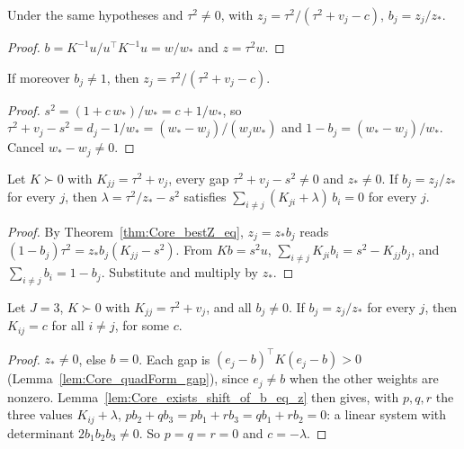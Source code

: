 \begin{theorem}\label{thm:Core_b_eq_of_equalCov}
  \leanok
  Under the same hypotheses and $\tau^2 \ne 0$, with
  $z_j = \tau^2/(\tau^2 + v_j - c)$, $b_j = z_j/z_*$.
\end{theorem}
\begin{proof}
  \leanok
  $b = K^{-1}u/u^\top K^{-1}u = w/w_*$ and $z = \tau^2 w$.
\end{proof}

\begin{theorem}\label{thm:Core_bestZ_of_equalCov}
  \leanok
  If moreover $b_j \ne 1$, then $z_j = \tau^2/(\tau^2 + v_j - c)$.
\end{theorem}
\begin{proof}
  \leanok
  $s^2 = (1 + c\,w_*)/w_* = c + 1/w_*$, so
  $\tau^2 + v_j - s^2 = d_j - 1/w_* = (w_* - w_j)/(w_j w_*)$ and
  $1 - b_j = (w_* - w_j)/w_*$. Cancel $w_* - w_j \ne 0$.
\end{proof}

\begin{lemma}\label{lem:Core_exists_shift_of_b_eq_z}
  \leanok
  Let $K \succ 0$ with $K_{jj} = \tau^2 + v_j$, every gap $\tau^2 + v_j - s^2 \ne 0$ and
  $z_* \ne 0$. If $b_j = z_j/z_*$ for every $j$, then
  $\lambda = \tau^2/z_* - s^2$ satisfies $\sum_{i \ne j} (K_{ji} + \lambda)\, b_i = 0$
  for every $j$.
\end{lemma}
\begin{proof}
  \leanok
  By Theorem~\ref{thm:Core_bestZ_eq}, $z_j = z_* b_j$ reads
  $(1 - b_j)\tau^2 = z_* b_j (K_{jj} - s^2)$. From $Kb = s^2 u$,
  $\sum_{i \ne j} K_{ji} b_i = s^2 - K_{jj} b_j$, and
  $\sum_{i \ne j} b_i = 1 - b_j$. Substitute and multiply by $z_*$.
\end{proof}

\begin{theorem}\label{thm:Core_equalCov_of_b_eq_z}
  \leanok
  Let $J = 3$, $K \succ 0$ with $K_{jj} = \tau^2 + v_j$, and all $b_j \ne 0$. If
  $b_j = z_j/z_*$ for every $j$, then $K_{ij} = c$ for all $i \ne j$, for some $c$.
\end{theorem}
\begin{proof}
  \leanok
  $z_* \ne 0$, else $b = 0$. Each gap is
  $(e_j - b)^\top K (e_j - b) > 0$ (Lemma~\ref{lem:Core_quadForm_gap}), since
  $e_j \ne b$ when the other weights are nonzero. Lemma~\ref{lem:Core_exists_shift_of_b_eq_z}
  then gives, with $p, q, r$ the three values $K_{ij} + \lambda$,
  $p b_2 + q b_3 = p b_1 + r b_3 = q b_1 + r b_2 = 0$: a linear system with
  determinant $2 b_1 b_2 b_3 \ne 0$. So $p = q = r = 0$ and $c = -\lambda$.
\end{proof}

